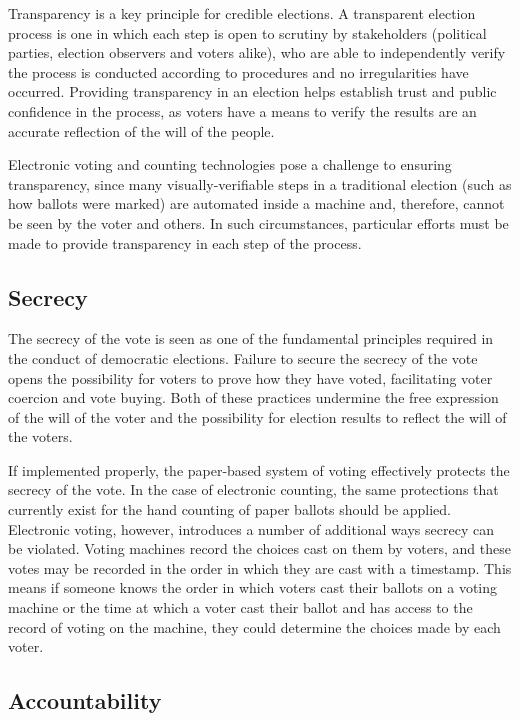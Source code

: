 \documentclass{article}
\begin{document}
Transparency is a key principle for credible elections. A transparent election process is one in which each step is open to scrutiny by stakeholders (political parties, election observers and voters alike), who are able to independently verify the process is conducted according to procedures and no irregularities have occurred. Providing transparency in an election helps establish trust and public confidence in the process, as voters have a means to verify the results are an accurate reflection of the will of the people.\par
Electronic voting and counting technologies pose a challenge to ensuring transparency, since many visually-verifiable steps in a traditional election (such as how ballots were marked) are automated inside a machine and, therefore, cannot be seen by the voter and others. In such circumstances, particular efforts must be made to provide transparency in each step of the process. 

\subsection{Secrecy}

The secrecy of the vote is seen as one of the fundamental principles required in the conduct of democratic elections. Failure to secure the secrecy of the vote opens the possibility for voters to prove how they have voted, facilitating voter coercion and vote buying. Both of these practices undermine the free expression of the will of the voter and the possibility for election results to reflect the will of the voters.\par
If implemented properly, the paper-based system of voting effectively protects the secrecy of the vote. In the case of electronic counting, the same protections that currently exist for the hand counting of paper ballots should be applied. Electronic voting, however, introduces a number of additional ways secrecy can be violated. Voting machines record the choices cast on them by voters, and these votes may be recorded in the order in which they are cast with a timestamp. This means if someone knows the order in which voters cast their ballots on a voting machine or the time at which a voter cast their ballot and has access to the record of voting on the machine, they could determine the choices made by each voter.

\subsection{Accountability}
\end{document}
